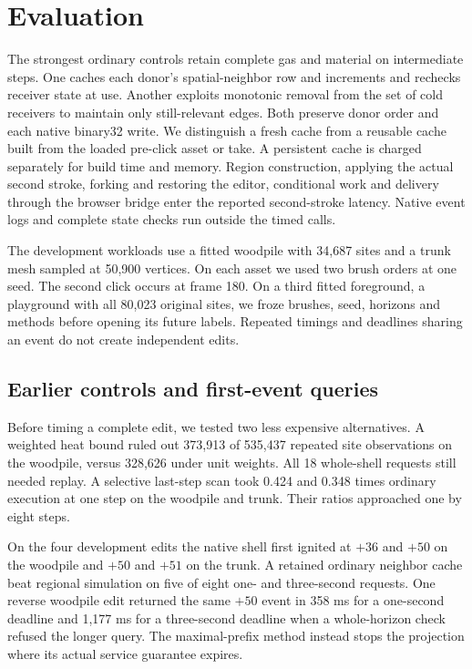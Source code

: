 \documentclass[acmtog,anonymous,review]{acmart}
\begin{document}
\section{Evaluation}
The strongest ordinary controls retain complete gas and material on intermediate steps. One caches each donor's spatial-neighbor row and increments and rechecks receiver state at use. Another exploits monotonic removal from the set of cold receivers to maintain only still-relevant edges. Both preserve donor order and each native binary32 write. We distinguish a fresh cache from a reusable cache built from the loaded pre-click asset or take. A persistent cache is charged separately for build time and memory. Region construction, applying the actual second stroke, forking and restoring the editor, conditional work and delivery through the browser bridge enter the reported second-stroke latency. Native event logs and complete state checks run outside the timed calls.

The development workloads use a fitted woodpile with 34,687 sites and a trunk mesh sampled at 50,900 vertices. On each asset we used two brush orders at one seed. The second click occurs at frame 180. On a third fitted foreground, a playground with all 80,023 original sites, we froze brushes, seed, horizons and methods before opening its future labels. Repeated timings and deadlines sharing an event do not create independent edits.

\subsection{Earlier controls and first-event queries}
Before timing a complete edit, we tested two less expensive alternatives. A weighted heat bound ruled out 373,913 of 535,437 repeated site observations on the woodpile, versus 328,626 under unit weights. All 18 whole-shell requests still needed replay. A selective last-step scan took 0.424 and 0.348 times ordinary execution at one step on the woodpile and trunk. Their ratios approached one by eight steps.

On the four development edits the native shell first ignited at $+36$ and $+50$ on the woodpile and $+50$ and $+51$ on the trunk. A retained ordinary neighbor cache beat regional simulation on five of eight one- and three-second requests. One reverse woodpile edit returned the same $+50$ event in 358 ms for a one-second deadline and 1,177 ms for a three-second deadline when a whole-horizon check refused the longer query. The maximal-prefix method instead stops the projection where its actual service guarantee expires.





\end{document}
